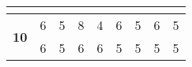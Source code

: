 \begin{table}[!htbp]
{\begin{tabular}{|c|ll|ll|ll|ll|}
                                 & \multicolumn{1}{c|}{}                                                                                   & \multicolumn{1}{c|}{}                                                                                & \multicolumn{1}{c|}{}                                                                                   & \multicolumn{1}{c|}{}                                                                                & \multicolumn{1}{c|}{}                                                                                   & \multicolumn{1}{c|}{}                                                                                & \multicolumn{1}{c|}{}                                                                                   & \multicolumn{1}{c|}{}                                                                                \\ \hline
\multirow{2}{*}{\textbf{10}}     & \multicolumn{1}{l|}{6}                                                                                  & 5                                                                                                    & \multicolumn{1}{l|}{8}                                                                                  & 4                                                                                                    & \multicolumn{1}{l|}{6}                                                                                  & 5                                                                                                    & \multicolumn{1}{l|}{6}                                                                                  & 5                                                                                                    \\ \cline{2-9} 
                                 & \multicolumn{1}{l|}{6}                                                                                  & 5                                                                                                    & \multicolumn{1}{l|}{6}                                                                                  & 6                                                                                                    & \multicolumn{1}{l|}{5}                                                                                  & 5                                                                                                    & \multicolumn{1}{l|}{5}                                                                                  & 5                                                                                                    \\ \hline

\end{tabular}}
\end{table}
